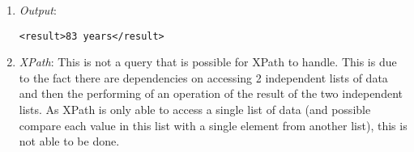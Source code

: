 \documentclass[11pt]{article}
\begin{document}
\begin{enumerate}
\item \textit{Output}:
\begin{verbatim}
<result>83 years</result>
\end{verbatim} 
\item \textit{XPath}: This is not a query that is possible for XPath to handle. This is due to the fact there are dependencies on accessing 2 independent lists of data and then the performing of an operation of the result of the two independent lists. As XPath is only able to access a single list of data (and possible compare each value in this list with a single element from another list), this is not able to be done.
\end{enumerate}



\end{document}
